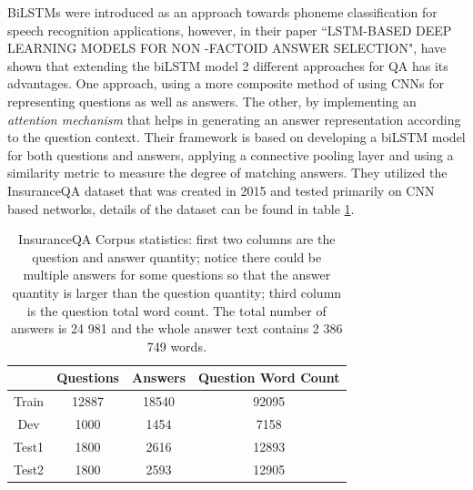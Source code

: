 \documentclass[12pt]{report}
\begin{document}
            BiLSTMs were introduced as an approach towards phoneme classification for speech recognition applications, however, in their paper ``LSTM-BASED DEEP LEARNING MODELS FOR NON -FACTOID ANSWER SELECTION", \citep{lstmhaighextractive} have shown that extending the biLSTM model 2 different approaches for QA has its advantages. One approach, using a more composite method of using CNNs for representing questions as well as answers. The other, by implementing an \textit{attention mechanism} that helps in generating an answer representation according to the question context.
            Their framework is based on developing a biLSTM model for both questions and answers, applying a connective pooling layer and using a similarity metric to measure the degree of matching answers. They utilized the InsuranceQA\citep{lstmInsuranceQA} dataset that was created in 2015 and tested primarily on CNN based networks, details of the dataset can be found in table \ref{lstmInsuranceQATable}.
          \begin{table}[h!]
              \centering
                \begin{tabular}{|c|c|c|c|}
                    \hline
                     & Questions & Answers & Question Word Count \\
                    \hline
                    Train & 12887 & 18540 & 92095 \\
                    \hline
                    Dev & 1000 & 1454& 7158 \\
                    \hline
                    Test1 & 1800 & 2616 & 12893 \\
                    \hline
                    Test2 & 1800 & 2593 & 12905 \\
                    \hline
                \end{tabular}
                \caption{InsuranceQA Corpus statistics: first two columns are the question and answer quantity; notice there could be multiple answers for some questions so that the answer quantity is larger than the question quantity; third column is the question total word count. The total number of answers is 24 981 and the whole answer text contains 2 386 749 words\citep{lstmInsuranceQA}.}\label{lstmInsuranceQATable}
            \end{table}
\end{document}
